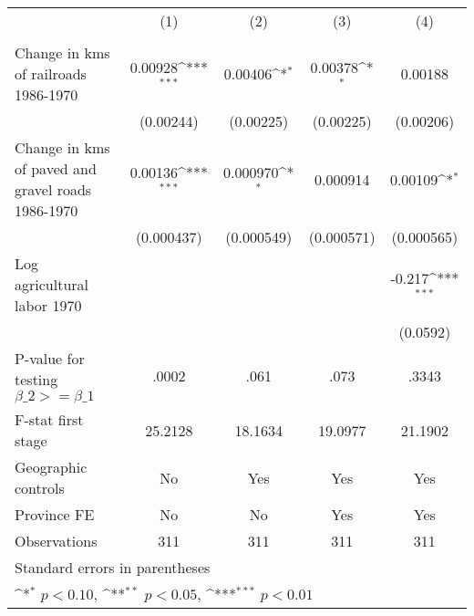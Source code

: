 {
\def\sym#1{\ifmmode^{#1}\else\(^{#1}\)\fi}
\begin{tabular}{l*{4}{c}}
\hline\hline
                &\multicolumn{1}{c}{(1)}&\multicolumn{1}{c}{(2)}&\multicolumn{1}{c}{(3)}&\multicolumn{1}{c}{(4)}\\
                &\multicolumn{1}{c}{}&\multicolumn{1}{c}{}&\multicolumn{1}{c}{}&\multicolumn{1}{c}{}\\
\hline
Change in kms of railroads 1986-1970&  0.00928\sym{***}&  0.00406\sym{*}  &  0.00378\sym{*}  &  0.00188         \\
                &(0.00244)         &(0.00225)         &(0.00225)         &(0.00206)         \\
[1em]
Change in kms of paved and gravel roads 1986-1970&  0.00136\sym{***}& 0.000970\sym{*}  & 0.000914         &  0.00109\sym{*}  \\
                &(0.000437)         &(0.000549)         &(0.000571)         &(0.000565)         \\
[1em]
Log agricultural labor 1970&                  &                  &                  &   -0.217\sym{***}\\
                &                  &                  &                  & (0.0592)         \\
\hline
P-value for testing $\beta\_{2} >= \beta\_{1}$&    .0002         &     .061         &     .073         &    .3343         \\
F-stat first stage&  25.2128         &  18.1634         &  19.0977         &  21.1902         \\
Geographic controls&       No         &      Yes         &      Yes         &      Yes         \\
Province FE     &       No         &       No         &      Yes         &      Yes         \\
Observations    &      311         &      311         &      311         &      311         \\
\hline\hline
\multicolumn{5}{l}{\footnotesize Standard errors in parentheses}\\
\multicolumn{5}{l}{\footnotesize \sym{*} \(p<0.10\), \sym{**} \(p<0.05\), \sym{***} \(p<0.01\)}\\
\end{tabular}
}
